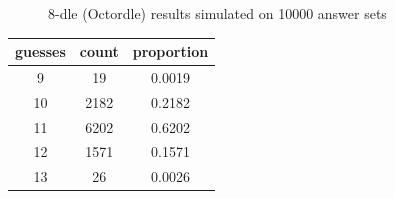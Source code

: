 \documentclass[11pt, oneside]{article} 	%
\begin{document}
\begin{figure}[!htb]
 \centering
 \qquad
 \caption{8-dle (Octordle) results simulated on 10000 answer sets}%
\end{figure}

\begin{center}
\begin{tabular}{ |c|c|c| }
 \hline
guesses & count & proportion \\
 \hline
9 & 19 & 0.0019 \\
10 & 2182 & 0.2182 \\
11 & 6202 & 0.6202 \\
12 & 1571 & 0.1571 \\
13 & 26 & 0.0026 \\
 \hline
\end{tabular}
\end{center}
\end{document}
